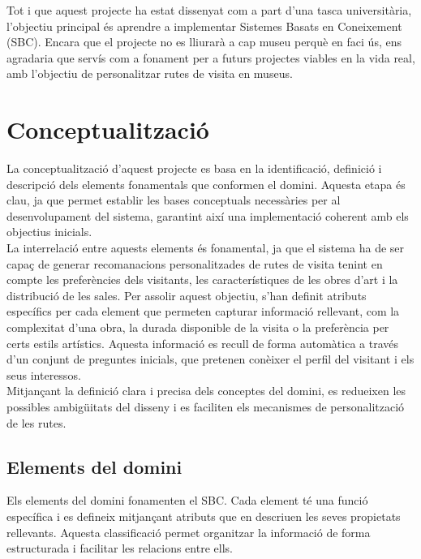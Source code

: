 \documentclass[a4paper]{article}
\begin{document}
	Tot i que aquest projecte ha estat dissenyat com a part d'una tasca universitària, l'objectiu principal és aprendre a implementar Sistemes Basats en Coneixement (SBC). Encara que el projecte no es lliurarà a cap museu perquè en faci ús, ens agradaria que servís com a fonament per a futurs projectes viables en la vida real, amb l'objectiu de personalitzar rutes de visita en museus.
	
	\newpage
	\section{Conceptualització}
	
	La conceptualització d'aquest projecte es basa en la identificació, definició i descripció dels elements fonamentals que conformen el domini. Aquesta etapa és clau, ja que permet establir les bases conceptuals necessàries per al desenvolupament del sistema, garantint així una implementació coherent amb els objectius inicials. \\
	
	La interrelació entre aquests elements és fonamental, ja que el sistema ha de ser capaç de generar recomanacions personalitzades de rutes de visita tenint en compte les preferències dels visitants, les característiques de les obres d'art i la distribució de les sales. Per assolir aquest objectiu, s'han definit atributs específics per cada element que permeten capturar informació rellevant, com la complexitat d'una obra, la durada disponible de la visita o la preferència per certs estils artístics. Aquesta informació es recull de forma automàtica a través d'un conjunt de preguntes inicials, que pretenen conèixer el perfil del visitant i els seus interessos. \\
	
	Mitjançant la definició clara i precisa dels conceptes del domini, es redueixen les possibles ambigüitats del disseny i es faciliten els mecanismes de personalització de les rutes. \\
		
	\subsection{Elements del domini}
	\label{sec:elements_del_domini}
	
	Els elements del domini fonamenten el SBC. Cada element té una funció específica i es defineix mitjançant atributs que en descriuen les seves propietats rellevants. Aquesta classificació permet organitzar la informació de forma estructurada i facilitar les relacions entre ells. \\
	
\end{document}
